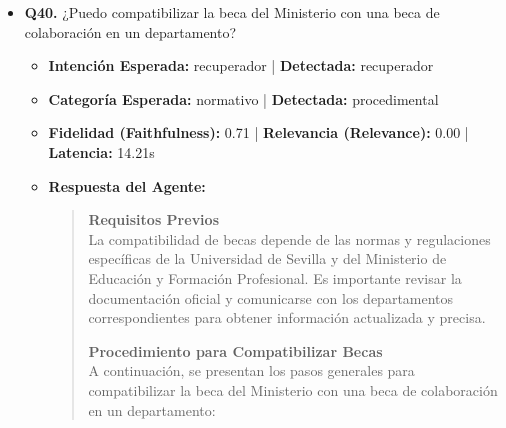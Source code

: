 \documentclass[12pt,a4paper,oneside]{report}
\begin{document}
\begin{itemize}
  
\item \textbf{Q40.} ¿Puedo compatibilizar la beca del Ministerio con una beca de colaboración en un departamento? \\
        \begin{itemize}
          \item \textbf{Intención Esperada:} recuperador | \textbf{Detectada:} recuperador
          \item \textbf{Categoría Esperada:} normativo | \textbf{Detectada:} procedimental
          \item \textbf{Fidelidad (Faithfulness):} 0.71 | \textbf{Relevancia (Relevance):} 0.00 | \textbf{Latencia:} 14.21s
          \item \textbf{{Respuesta del Agente:}} \\
                \begin{quote}

\noindent\textbf{Requisitos Previos}\\

La compatibilidad de becas depende de las normas y regulaciones específicas de la Universidad de Sevilla y del Ministerio de Educación y Formación Profesional. Es importante revisar la documentación oficial y comunicarse con los departamentos correspondientes para obtener información actualizada y precisa.


\noindent\textbf{Procedimiento para Compatibilizar Becas}\\

A continuación, se presentan los pasos generales para compatibilizar la beca del Ministerio con una beca de colaboración en un departamento:


\end{quote}
\end{itemize}
\end{itemize}
\end{document}
